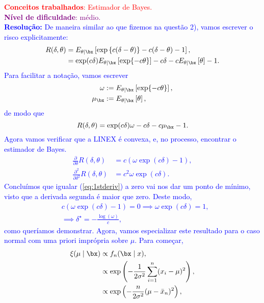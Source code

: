\textcolor{red}{\textbf{Conceitos trabalhados}: Estimador de Bayes.}\\ \textcolor{purple}{\textbf{Nível de dificuldade}: médio.}\\
\textcolor{blue}{
\textbf{Resolução:}
De maneira similar ao que fizemos na questão 2), vamos escrever o risco explicitamente:
\begin{align*}
    R(\delta, \theta) &= E_{\theta \mid \bx}\left[ \exp\left\{c(\delta-\theta)\right\} - c(\delta-\theta) -1\right],\\
     &= \exp(c\delta)E_{\theta \mid \bx}\left[\exp\{-c\theta\}\right] - c\delta-cE_{\theta \mid \bx}\left[\theta\right] -1.
\end{align*}
Para facilitar a notação, vamos escrever
\begin{align*}
    \omega & := E_{\theta \mid \bx}\left[\exp\{-c\theta\}\right],\\
    \mu_{\bx} &:=  E_{\theta \mid \bx}\left[\theta\right],
\end{align*}
de modo que 
\begin{equation*}
    R(\delta, \theta) = \exp(c\delta)\omega - c\delta-c\mu_{\bx} -1.
\end{equation*}
Agora vamos verificar que a LINEX é convexa, e, no processo, encontrar o estimador de Bayes.
\begin{align}
\label{eq:1stderiv}
    \frac{\partial }{\partial \delta} R(\delta, \theta) &= c(\omega\exp(c\delta)-1),\\
    \frac{\partial^2}{\partial \delta^2} R(\delta, \theta) &= c^2\omega\exp(c\delta).
\end{align}
Concluímos que igualar (\ref{eq:1stderiv}) a zero vai nos dar um ponto de mínimo, visto que a derivada segunda é maior que zero.
Deste modo, 
\begin{align*}
    &c(\omega\exp(c\delta)-1) = 0 \implies \omega\exp(c\delta) = 1,\\
    &\implies \delta^\star = -\frac{\log\left(\omega\right)}{c},
\end{align*}
como queríamos demonstrar.
Agora, vamos especializar este resultado para o caso normal com uma priori imprópria sobre $\mu$.
Para começar, 
\begin{align*}
    \xi(\mu \mid \bx) &\propto f_n(\bx \mid x),\\
    &\propto \exp\left(-\frac{1}{2\sigma^2}\sum_{i=1}^n (x_i-\mu)^2\right),\\
    &\propto \exp\left(-\frac{n}{2\sigma^2} (\mu-\bar{x}_n)^2\right),
\end{align*}
}
